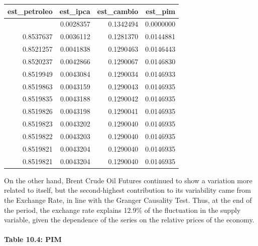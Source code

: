 \documentclass[12pt]{article}
\begin{document}
\begin{longtable}[]{@{}rrrr@{}}
\toprule\noalign{}
est\_petroleo & est\_ipca & est\_cambio & est\_pim \\
\midrule\noalign{}
\endhead
\bottomrule\noalign{}
\endlastfoot
0.8629149 & 0.0028357 & 0.1342494 & 0.0000000 \\
0.8537637 & 0.0036112 & 0.1281370 & 0.0144881 \\
0.8521257 & 0.0041838 & 0.1290463 & 0.0146443 \\
0.8520237 & 0.0042866 & 0.1290067 & 0.0146830 \\
0.8519949 & 0.0043084 & 0.1290034 & 0.0146933 \\
0.8519863 & 0.0043159 & 0.1290043 & 0.0146935 \\
0.8519835 & 0.0043188 & 0.1290042 & 0.0146935 \\
0.8519826 & 0.0043198 & 0.1290041 & 0.0146935 \\
0.8519823 & 0.0043202 & 0.1290040 & 0.0146935 \\
0.8519822 & 0.0043203 & 0.1290040 & 0.0146935 \\
0.8519821 & 0.0043204 & 0.1290040 & 0.0146935 \\
0.8519821 & 0.0043204 & 0.1290040 & 0.0146935 \\
\end{longtable}

On the other hand, Brent Crude Oil Futures continued to show a variation
more related to itself, but the second-highest contribution to its
variability came from the Exchange Rate, in line with the Granger
Causality Test. Thus, at the end of the period, the exchange rate
explains 12.9\% of the fluctuation in the supply variable, given the
dependence of the series on the relative prices of the economy.

\hypertarget{table-10.4-pim}{%
\paragraph{Table 10.4: PIM}\label{table-10.4-pim}}
\end{document}
